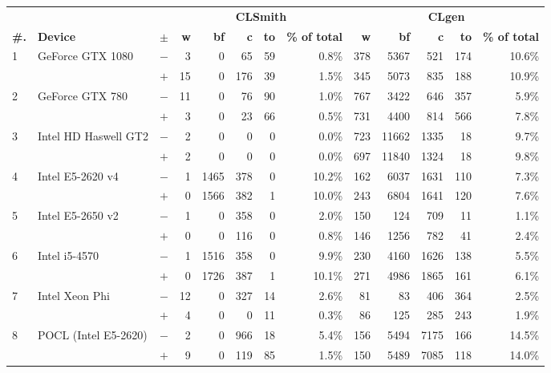   \begin{tabular}{lll | rrrrr | rrrrr }
  \toprule
  & & & \multicolumn{5}{c|}{\textbf{CLSmith}} & \multicolumn{5}{c}{\textbf{CLgen}} \\
  \textbf{\#.} & \textbf{Device} & $\pm$ &
  \textbf{w} & \textbf{bf} & \textbf{c} & \textbf{to} & \textbf{\% of total} &
  \textbf{w} & \textbf{bf} & \textbf{c} & \textbf{to} & \textbf{\% of total} \\
  \midrule
  \multirow{ 2}{*}{1} & \multirow{ 2}{*}{GeForce GTX 1080} & $-$ & 3 & 0 & 65 & 59 & 0.8\%       & 378 & 5367 & 521 & 174 & 10.6\% \\& & $+$ & 15 & 0 & 176 & 39 & 1.5\% & 345 & 5073 & 835 & 188 & 10.9\% \\
\hline
\multirow{ 2}{*}{2} & \multirow{ 2}{*}{GeForce GTX 780} & $-$ & 11 & 0 & 76 & 90 & 1.0\%       & 767 & 3422 & 646 & 357 & 5.9\% \\& & $+$ & 3 & 0 & 23 & 66 & 0.5\% & 731 & 4400 & 814 & 566 & 7.8\% \\
\hline
\multirow{ 2}{*}{3} & \multirow{ 2}{*}{Intel HD Haswell GT2} & $-$ & 2 & 0 & 0 & 0 & 0.0\%       & 723 & 11662 & 1335 & 18 & 9.7\% \\& & $+$ & 2 & 0 & 0 & 0 & 0.0\% & 697 & 11840 & 1324 & 18 & 9.8\% \\
\hline
\multirow{ 2}{*}{4} & \multirow{ 2}{*}{Intel E5-2620 v4} & $-$ & 1 & 1465 & 378 & 0 & 10.2\%       & 162 & 6037 & 1631 & 110 & 7.3\% \\& & $+$ & 0 & 1566 & 382 & 1 & 10.0\% & 243 & 6804 & 1641 & 120 & 7.6\% \\
\hline
\multirow{ 2}{*}{5} & \multirow{ 2}{*}{Intel E5-2650 v2} & $-$ & 1 & 0 & 358 & 0 & 2.0\%       & 150 & 124 & 709 & 11 & 1.1\% \\& & $+$ & 0 & 0 & 116 & 0 & 0.8\% & 146 & 1256 & 782 & 41 & 2.4\% \\
\hline
\multirow{ 2}{*}{6} & \multirow{ 2}{*}{Intel i5-4570} & $-$ & 1 & 1516 & 358 & 0 & 9.9\%       & 230 & 4160 & 1626 & 138 & 5.5\% \\& & $+$ & 0 & 1726 & 387 & 1 & 10.1\% & 271 & 4986 & 1865 & 161 & 6.1\% \\
\hline
\multirow{ 2}{*}{7} & \multirow{ 2}{*}{Intel Xeon Phi} & $-$ & 12 & 0 & 327 & 14 & 2.6\%       & 81 & 83 & 406 & 364 & 2.5\% \\& & $+$ & 4 & 0 & 0 & 11 & 0.3\% & 86 & 125 & 285 & 243 & 1.9\% \\
\hline
\multirow{ 2}{*}{8} & \multirow{ 2}{*}{POCL (Intel E5-2620)} & $-$ & 2 & 0 & 966 & 18 & 5.4\%       & 156 & 5494 & 7175 & 166 & 14.5\% \\& & $+$ & 9 & 0 & 119 & 85 & 1.5\% & 150 & 5489 & 7085 & 118 & 14.0\% \\

\end{tabular}
